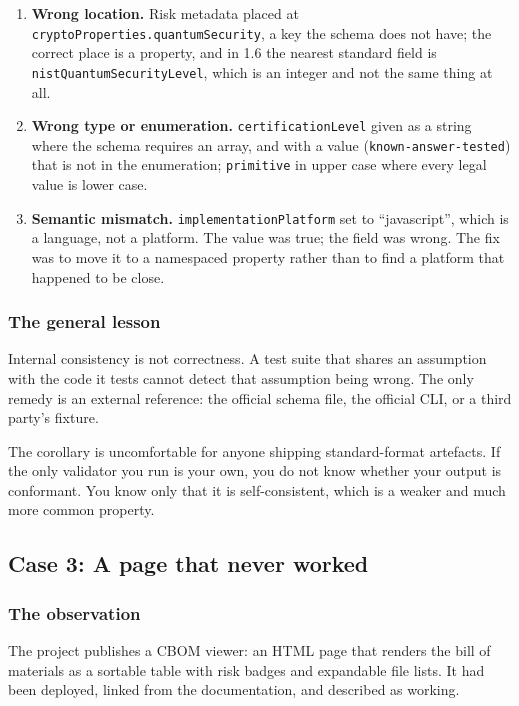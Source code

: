 \begin{enumerate}[leftmargin=*]
  \item \textbf{Wrong location.} Risk metadata placed at
        \texttt{cryptoProperties.quantumSecurity}, a key the schema does not
        have; the correct place is a property, and in 1.6 the nearest standard
        field is \texttt{nistQuantumSecurityLevel}, which is an integer and not
        the same thing at all.
  \item \textbf{Wrong type or enumeration.} \texttt{certificationLevel} given as
        a string where the schema requires an array, and with a value
        (\texttt{known-answer-tested}) that is not in the enumeration;
        \texttt{primitive} in upper case where every legal value is lower case.
  \item \textbf{Semantic mismatch.} \texttt{implementationPlatform} set to
        ``javascript'', which is a language, not a platform. The value was true;
        the field was wrong. The fix was to move it to a namespaced property
        rather than to find a platform that happened to be close.
\end{enumerate}

\subsubsection{The general lesson}

Internal consistency is not correctness. A test suite that shares an assumption
with the code it tests cannot detect that assumption being wrong. The only
remedy is an external reference: the official schema file, the official CLI, or
a third party's fixture.

The corollary is uncomfortable for anyone shipping standard-format artefacts. If
the only validator you run is your own, you do not know whether your output is
conformant. You know only that it is self-consistent, which is a weaker and much
more common property.

\subsection{Case 3: A page that never worked}
\label{sec:case-study-viewer}

\subsubsection{The observation}

The project publishes a CBOM viewer: an HTML page that renders the bill of
materials as a sortable table with risk badges and expandable file lists. It had
been deployed, linked from the documentation, and described as working.

